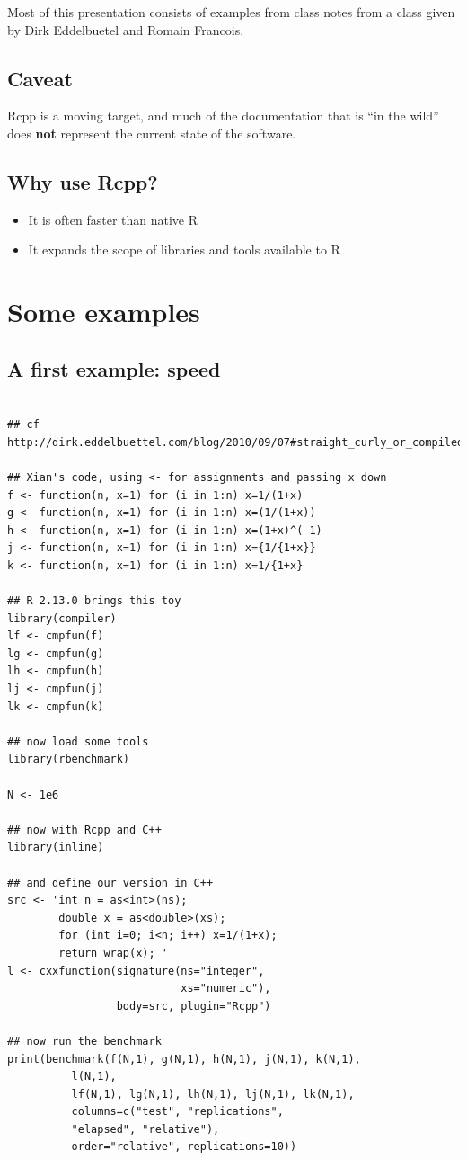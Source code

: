 \documentclass[11pt]{article}
\begin{document}
Most of this presentation consists of examples from class notes from a
class given by Dirk Eddelbuetel and Romain Francois.
\subsection{Caveat}
\label{sec-2-2}


Rcpp is a moving target, and much of the documentation that is ``in the
wild'' does \textbf{not} represent the current state of the software.
\subsection{Why use Rcpp?}
\label{sec-2-3}


\begin{itemize}
\item It is often faster than native R
\item It expands the scope of libraries and tools available to R
\end{itemize}
\section{Some examples}
\label{sec-3}
\subsection{A first example: speed}
\label{sec-3-1}



\begin{verbatim}

## cf http://dirk.eddelbuettel.com/blog/2010/09/07#straight_curly_or_compiled

## Xian's code, using <- for assignments and passing x down
f <- function(n, x=1) for (i in 1:n) x=1/(1+x)
g <- function(n, x=1) for (i in 1:n) x=(1/(1+x))
h <- function(n, x=1) for (i in 1:n) x=(1+x)^(-1)
j <- function(n, x=1) for (i in 1:n) x={1/{1+x}}
k <- function(n, x=1) for (i in 1:n) x=1/{1+x}

## R 2.13.0 brings this toy
library(compiler)
lf <- cmpfun(f)
lg <- cmpfun(g)
lh <- cmpfun(h)
lj <- cmpfun(j)
lk <- cmpfun(k)

## now load some tools
library(rbenchmark)

N <- 1e6

## now with Rcpp and C++
library(inline)

## and define our version in C++
src <- 'int n = as<int>(ns);
        double x = as<double>(xs);
        for (int i=0; i<n; i++) x=1/(1+x);
        return wrap(x); '
l <- cxxfunction(signature(ns="integer",
                           xs="numeric"),
                 body=src, plugin="Rcpp")

## now run the benchmark
print(benchmark(f(N,1), g(N,1), h(N,1), j(N,1), k(N,1),
          l(N,1),
          lf(N,1), lg(N,1), lh(N,1), lj(N,1), lk(N,1),
          columns=c("test", "replications",
          "elapsed", "relative"),
          order="relative", replications=10))
\end{verbatim}
\end{document}
